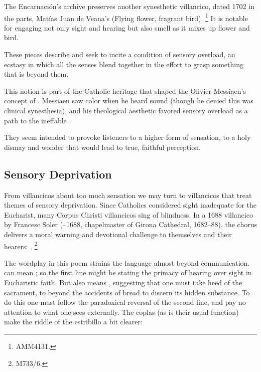 The Encarnación's archive preserves another synesthetic villancico, dated 1702 in the parts, Matías Juan de Veana's  (Flying flower, fragrant bird).%
  \footnote{\signature{E-MO}{AMM4131}.}
It is notable for engaging not only sight and hearing but also smell as it mixes up flower and bird.

These pieces describe and seek to incite a condition of sensory overload, an ecstasy in which all the senses blend together in the effort to grasp something that is beyond them.%
  \begin{Footnote}
  This notion is part of the Catholic heritage that shaped the Olivier Messiaen's concept of .
  Messiaen saw color when he heard sound (though he denied this was clinical synesthesia), and his theological aesthetic favored sensory overload as a path to the ineffable .\XXX
  \end{Footnote}
They seem intended to provoke listeners to a higher form of sensation, to a holy dismay and wonder that would lead to true, faithful perception.


\subsection{Sensory Deprivation}

From villancicos about too much sensation we may turn to villancicos that treat themes of sensory deprivation.
Since Catholics considered sight inadequate for the Eucharist, many Corpus Christi villancicos sing of blindness.
In a 1688 villancico  by Francesc Soler (--1688, chapelmaster of Girona Cathedral, 1682--88), the chorus delivers a moral warning and devotional challenge to themselves and their hearers: .%
  \footnote{\signature{E-Bbc}{M733/6}.}


The wordplay in this poem strains the language almost beyond communication.
 can mean ; so the first line might be stating the primacy of hearing over sight in Eucharistic faith.
But  also means , suggesting that one must take heed of the sacrament, to  beyond the accidents of bread to discern its hidden substance.
To do this one must follow the paradoxical reversal of the second line, and pay no attention to what one sees externally.
The coplas (as is their usual function) make the riddle of the estribillo a bit clearer:

